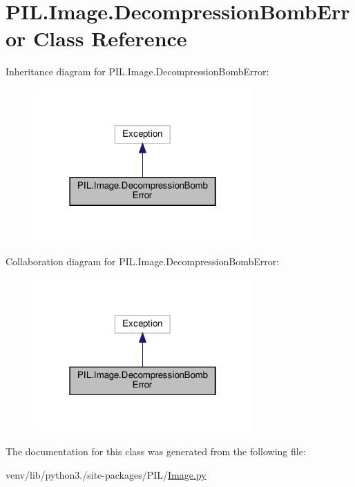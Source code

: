 \hypertarget{classPIL_1_1Image_1_1DecompressionBombError}{}\section{P\+I\+L.\+Image.\+Decompression\+Bomb\+Error Class Reference}
\label{classPIL_1_1Image_1_1DecompressionBombError}


Inheritance diagram for P\+I\+L.\+Image.\+Decompression\+Bomb\+Error\+:
\nopagebreak
\begin{figure}[H]
\begin{center}
\leavevmode
\includegraphics[width=238pt]{classPIL_1_1Image_1_1DecompressionBombError__inherit__graph}
\end{center}
\end{figure}


Collaboration diagram for P\+I\+L.\+Image.\+Decompression\+Bomb\+Error\+:
\nopagebreak
\begin{figure}[H]
\begin{center}
\leavevmode
\includegraphics[width=238pt]{classPIL_1_1Image_1_1DecompressionBombError__coll__graph}
\end{center}
\end{figure}


The documentation for this class was generated from the following file\+:\begin{DoxyCompactItemize}
\item 
venv/lib/python3./site-\/packages/\+P\+I\+L/\hyperlink{Image_8py}{Image.\+py}\end{DoxyCompactItemize}

